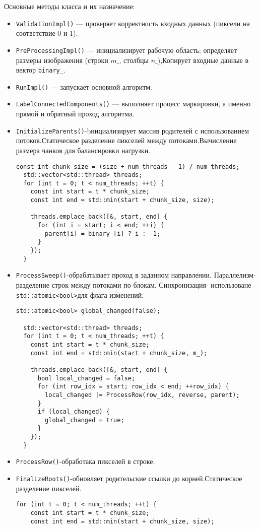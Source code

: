 \documentclass[12pt]{extarticle}
\begin{document}
Основные методы класса и их назначение:
\begin{itemize}
   \item \texttt{ValidationImpl()} — проверяет корректность входных данных (пиксели на соответствие 0 и 1).
   \item \texttt{PreProcessingImpl()} — инициализирует рабочую область: определяет размеры изображения (строки $m\_$, столбцы $n\_$),Копирует входные данные в вектор \texttt{binary\_}.
   \item \texttt{RunImpl()} — запускает основной алгоритм.
   \item \texttt{LabelConnectedComponents()} — выполняет процесс маркировки, а именно прямой и обратный проход алгоритма.
   \item \texttt{InitializeParents()}-bнициализирует массив родителей с использованием потоков.Статическое разделение пикселей между потоками.Вычисление размера чанков для балансировки нагрузки.
   \begin{lstlisting}[caption={Статическое разделение пикселей и вычисление размера чанков},label={all}]
  const int chunk_size = (size + num_threads - 1) / num_threads;
  std::vector<std::thread> threads;
  for (int t = 0; t < num_threads; ++t) {
    const int start = t * chunk_size;
    const int end = std::min(start + chunk_size, size);

    threads.emplace_back([&, start, end] {
      for (int i = start; i < end; ++i) {
        parent[i] = binary_[i] ? i : -1;
      }
    });
  }
\end{lstlisting}
  \item \texttt{ProcessSweep()}-обрабатывает проход в заданном направлении. Параллелизм-разделение строк между потоками по блокам. Синхронизация- использоване \texttt{std::atomic<bool>}для флага изменений.
  \begin{lstlisting}[caption={Параллелизм в методе ProcessSweep},label={all}]
 std::atomic<bool> global_changed(false);

  std::vector<std::thread> threads;
  for (int t = 0; t < num_threads; ++t) {
    const int start = t * chunk_size;
    const int end = std::min(start + chunk_size, m_);

    threads.emplace_back([&, start, end] {
      bool local_changed = false;
      for (int row_idx = start; row_idx < end; ++row_idx) {
        local_changed |= ProcessRow(row_idx, reverse, parent);
      }
      if (local_changed) {
        global_changed = true;
      }
    });
  }
  \end{lstlisting}
  \item \texttt{ProcessRow()}-обработака пикселей в строке.
  \item \texttt{FinalizeRoots()}-обновляет родительские ссылки до корней.Статическое разделение пикселей.
  \begin{lstlisting}[caption={Обновление родительских ссылок в методе FinalizeRoots},label={all}]
   for (int t = 0; t < num_threads; ++t) {
    const int start = t * chunk_size;
    const int end = std::min(start + chunk_size, size);


\end{lstlisting}
\end{itemize}
\end{document}
